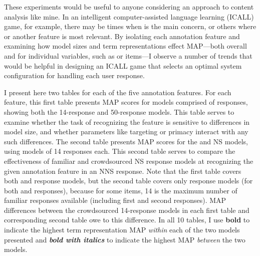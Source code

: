 These experiments would be useful to anyone considering an approach to content analysis like mine. In an intelligent computer-assisted language learning (ICALL) game, for example, there may be times when  is the main concern, or others where  or another feature is most relevant. By isolating each annotation feature and examining how model sizes and term representations effect MAP---both overall and for individual variables, such as  or  items---I observe a number of trends that would be helpful in designing an ICALL game that selects an optimal system configuration for handling each user response.

I present here two tables for each of the five annotation features. For each feature, this first table presents MAP scores for models comprised of  responses, showing both the 14-response and 50-response models. This table serves to examine whether the task of recognizing the feature is sensitive to differences in model size, and whether parameters like targeting or primacy interact with any such differences. The second table presents MAP scores for the  and  NS models, using models of 14 responses each. This second table serves to compare the effectiveness of familiar and crowdsourced NS response models at recognizing the given annotation feature in an NNS response. Note that the first table covers both  and  response models, but the second table covers only  response models (for both  and  responses), because for some items, 14 is the maximum number of familiar responses available (including first and second responses). MAP differences between the crowdsourced 14-response models in each first table and corresponding second table owe to this difference. In all 10 tables, I use \textbf{bold} to indicate the highest term representation MAP \textit{within} each of the two models presented and \textit{\textbf{bold with italics}} to indicate the highest MAP \textit{between} the two models.

